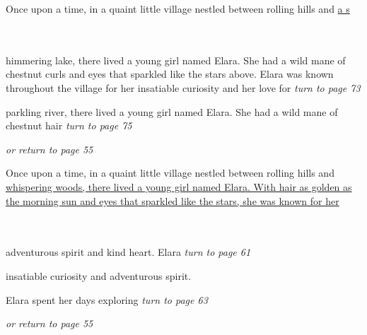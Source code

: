 \documentclass{memoir}
\begin{document}
        


        \hspace{1cm}\vfill
        \begin{minipage}{3in}
        \LARGE
        Once upon a time, in a quaint little village nestled between rolling hills and \ul{a s}\\ \vspace{5mm} \\
  \\ 

        \hspace{1cm}\begin{minipage}{6cm}
        \normalsize
            himmering lake, there lived a young girl named Elara. She had a wild mane of chestnut curls and eyes that sparkled like the stars above. Elara was known throughout the village for her insatiable curiosity and her love for \hfill \textit{turn to page 73}\\ \vspace{5mm}

parkling river, there lived a young girl named Elara. She had a wild mane of chestnut hair  \hfill \textit{turn to page 75}\\ \vspace{5mm}

\hfill \textit{or return to page 55}
        \end{minipage} 
        \end{minipage}
        \hspace{1cm}\vfill
        \cleardoublepage

        


        \hspace{1cm}\vfill
        \begin{minipage}{3in}
        \LARGE
        Once upon a time, in a quaint little village nestled between rolling hills and \ul{whispering woods, there lived a young girl named Elara. With hair as golden as the morning sun and eyes that sparkled like the stars, she was known for her}\\ \vspace{5mm} \\
  \\ 

        \hspace{1cm}\begin{minipage}{6cm}
        \normalsize
            adventurous spirit and kind heart. Elara  \hfill \textit{turn to page 61}\\ \vspace{5mm}

insatiable curiosity and adventurous spirit.

Elara spent her days exploring \hfill \textit{turn to page 63}\\ \vspace{5mm}

\hfill \textit{or return to page 55}
        \end{minipage} 
        \end{minipage}
        \hspace{1cm}\vfill
        \cleardoublepage
\end{document}
